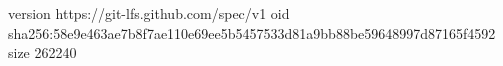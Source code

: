 version https://git-lfs.github.com/spec/v1
oid sha256:58e9e463ae7b8f7ae110e69ee5b5457533d81a9bb88be59648997d87165f4592
size 262240
